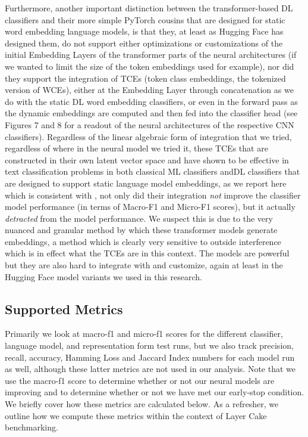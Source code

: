 \documentclass[final]{clv2025-revised}
\begin{document}
Furthermore, another important distinction between the transformer-based DL classifiers and their more simple PyTorch cousins that are designed for static word embedding language models, is that they, at least as Hugging Face has designed them, do not support either optimizations or customizations of the initial Embedding Layers of the transformer parts of the neural architectures (if we wanted to limit the size of the token embeddings used for example), nor did they support the integration of TCEs (token class embeddings, the tokenized version of WCEs), either at the Embedding Layer through concatenation as we do with the static DL word embedding classifiers, or even in the forward pass as the dynamic embeddings are computed and then fed into the classifier head (see Figures 7 and 8 for a readout of the neural architectures of the respective CNN classifiers). Regardless of the linear algebraic form of integration that we tried, regardless of where in the neural model we tried it, these TCEs that are constructed in their own latent vector space and have shown to be effective in text classification problems in both classical ML classifiers andDL classifiers that are designed to support static language model embeddings, as we report here which is consistent with \cite{moreo2021}, not only did their integration \textit{not} improve the classifier model performance (in terms of Macro-F1 and Micro-F1 scores), but it actually \textit{detracted} from the model performance. We suspect this is due to the very nuanced and granular method by which these transformer models generate embeddings, a method which is clearly very sensitive to outside interference which is in effect what the TCEs are in this context. The models are powerful but they are also hard to integrate with and customize, again at least in the Hugging Face model variants we used in this research.


\subsection{Supported Metrics}
Primarily we look at macro-f1 and micro-f1 scores for the different classifier, language model, and representation form test runs, but we also track precision, recall, accuracy, Hamming Loss and Jaccard Index numbers for each model run as well, although these latter metrics are not used in our analysis. Note that we use the macro-f1 score to determine whether or not our neural models are improving and to determine whether or not we have met our early-stop condition. We briefly cover how these metrics are calculated below. As a refresher, we outline how we compute these metrics within the context of Layer Cake benchmarking. 
\end{document}
